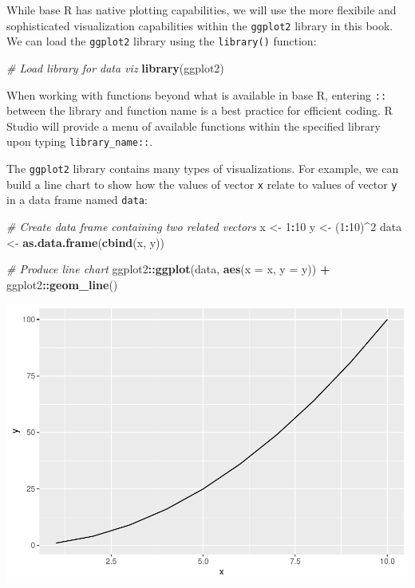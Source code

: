 \documentclass[]{book}
\newenvironment{Shaded}{\begin{snugshade}}{\end{snugshade}}
\newcommand{\CommentTok}[1]{\textcolor[rgb]{0.56,0.35,0.01}{\textit{#1}}}
\newcommand{\DataTypeTok}[1]{\textcolor[rgb]{0.13,0.29,0.53}{#1}}
\newcommand{\DecValTok}[1]{\textcolor[rgb]{0.00,0.00,0.81}{#1}}
\newcommand{\KeywordTok}[1]{\textcolor[rgb]{0.13,0.29,0.53}{\textbf{#1}}}
\newcommand{\NormalTok}[1]{#1}
\newcommand{\OperatorTok}[1]{\textcolor[rgb]{0.81,0.36,0.00}{\textbf{#1}}}
\newcommand{\StringTok}[1]{\textcolor[rgb]{0.31,0.60,0.02}{#1}}
\begin{document}
While base R has native plotting capabilities, we will use the more flexibile and sophisticated visualization capabilities within the \texttt{ggplot2} library in this book. We can load the \texttt{ggplot2} library using the \texttt{library()} function:

\begin{Shaded}
\begin{Highlighting}[]
\CommentTok{# Load library for data viz}
\KeywordTok{library}\NormalTok{(ggplot2)}
\end{Highlighting}
\end{Shaded}

When working with functions beyond what is available in base R, entering \texttt{::} between the library and function name is a best practice for efficient coding. R Studio will provide a menu of available functions within the specified library upon typing \texttt{library\_name::}.

The \texttt{ggplot2} library contains many types of visualizations. For example, we can build a line chart to show how the values of vector \texttt{x} relate to values of vector \texttt{y} in a data frame named \texttt{data}:

\begin{Shaded}
\begin{Highlighting}[]
\CommentTok{# Create data frame containing two related vectors}
\NormalTok{x <-}\StringTok{ }\DecValTok{1}\OperatorTok{:}\DecValTok{10}
\NormalTok{y <-}\StringTok{ }\NormalTok{(}\DecValTok{1}\OperatorTok{:}\DecValTok{10}\NormalTok{)}\OperatorTok{^}\DecValTok{2}
\NormalTok{data <-}\StringTok{ }\KeywordTok{as.data.frame}\NormalTok{(}\KeywordTok{cbind}\NormalTok{(x, y))}

\CommentTok{# Produce line chart}
\NormalTok{ggplot2}\OperatorTok{::}\KeywordTok{ggplot}\NormalTok{(data, }\KeywordTok{aes}\NormalTok{(}\DataTypeTok{x =}\NormalTok{ x, }\DataTypeTok{y =}\NormalTok{ y)) }\OperatorTok{+}
\NormalTok{ggplot2}\OperatorTok{::}\KeywordTok{geom_line}\NormalTok{()}
\end{Highlighting}
\end{Shaded}

\includegraphics{The_People_Analytics_Companion_files/figure-latex/unnamed-chunk-51-1.pdf}
\end{document}

